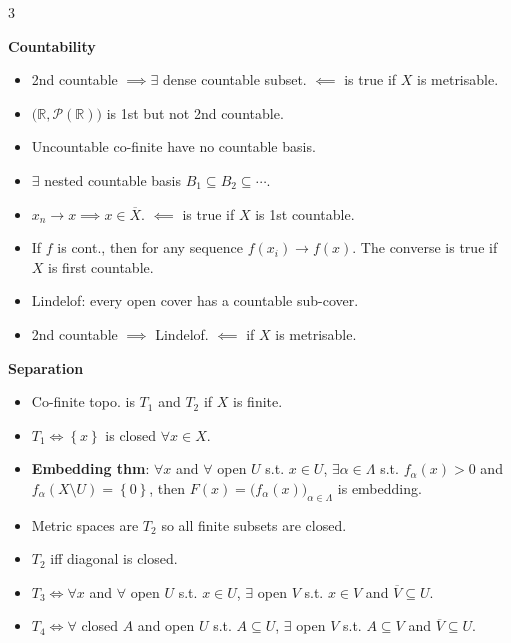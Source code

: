 \documentclass[10pt]{article}
\newcommand{\R}{\mathbb{R}} %
\begin{document}
\begin{multicols*}{3}
\begin{itemize}
        \end{itemize}
        \textbf{Countability}
        \begin{itemize}
            \setlength\itemsep{0.1em}
            \item 2nd countable $\implies\exists$ dense countable subset. $\impliedby$ is true if $X$ is metrisable.
            \item $\bigl(\R, \mathcal{P}\left(\R\right)\bigr)$ is 1st but not 2nd countable.
            \item Uncountable co-finite have no countable basis.
            \item $\exists$ nested countable basis $B_1 \subseteq B_2 \subseteq \cdots$.
            \item $x_n \to x \implies x \in \overline{X}$. $\impliedby$ is true if $X$ is 1st countable.
            \item If $f$ is cont., then for any sequence $f\left(x_i\right) \to f\left(x\right)$. The converse is true if $X$ is first countable.
            \item Lindelof: every open cover has a countable sub-cover.
            \item 2nd countable $\implies$ Lindelof. $\impliedby$ if $X$ is metrisable.
        \end{itemize}
        \textbf{Separation}
        \begin{itemize}
            \setlength\itemsep{0.11em}
            \item Co-finite topo. is $T_1$ and $T_2$ if $X$ is finite.
            \item $T_1 \iff \left\{x\right\}$ is closed $\forall x \in X$.
            \item \textbf{Embedding thm}: $\forall x$ and $\forall$ open $U$ s.t. $x \in U$, $\exists\alpha \in \Lambda$ s.t. $f_{\alpha}\left(x\right) > 0$ and $f_{\alpha}\left(X \setminus U\right) = \left\{0\right\}$, then $F\left(x\right) = \bigl(f_{\alpha}\left(x\right)\bigr)_{\alpha \in \Lambda}$ is embedding.
            \item Metric spaces are $T_2$ so all finite subsets are closed.
            \item $T_2$ iff diagonal is closed.
            \item $T_3 \iff \forall x$ and $\forall$ open $U$ s.t. $x \in U$, $\exists$ open $V$ s.t. $x \in V$ and $\overline{V} \subseteq U$.
            \item $T_4 \iff \forall$ closed $A$ and open $U$ s.t. $A \subseteq U$, $\exists$ open $V$ s.t. $A \subseteq V$ and $\overline{V} \subseteq U$.

\end{itemize}
\end{multicols*}
\end{document}
